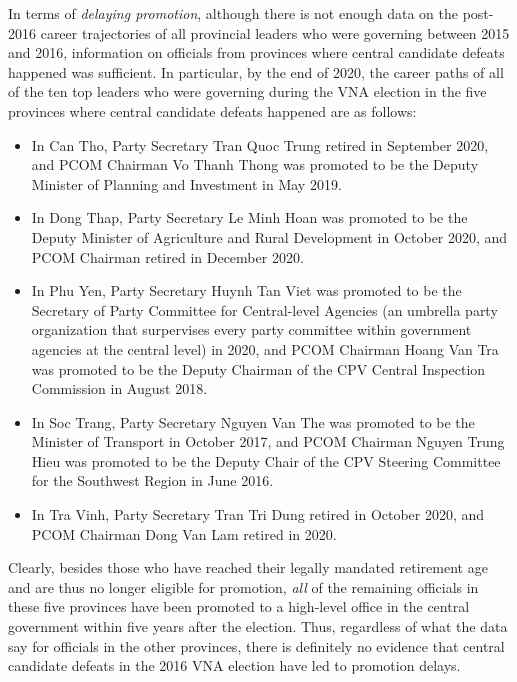 \documentclass[12pt]{article}
\newcommand{\1}{\mathbbm{1}}
\begin{document}
In terms of \textit{delaying promotion}, although there is not enough data on the post-2016 career trajectories of all provincial leaders who were governing between 2015 and 2016, information on officials from provinces where central candidate defeats happened was sufficient. In particular, by the end of 2020, the career paths of all of the ten top leaders who were governing during the VNA election in the five provinces where central candidate defeats happened are as follows:

\begin{itemize}
	\item In Can Tho, Party Secretary Tran Quoc Trung retired in September 2020, and PCOM Chairman Vo Thanh Thong was promoted to be the Deputy Minister of Planning and Investment in May 2019.
	\item In Dong Thap, Party Secretary Le Minh Hoan was promoted to be the Deputy Minister of Agriculture and Rural Development in October 2020, and PCOM Chairman retired in December 2020.
	\item In Phu Yen, Party Secretary Huynh Tan Viet was promoted to be the Secretary of Party Committee for Central-level Agencies (an umbrella party organization that surpervises every party committee within government agencies at the central level) in 2020, and PCOM Chairman Hoang Van Tra was promoted to be the Deputy Chairman of the CPV Central Inspection Commission in August 2018.
	\item In Soc Trang, Party Secretary Nguyen Van The was promoted to be the Minister of Transport in October 2017, and PCOM Chairman Nguyen Trung Hieu was promoted to be the Deputy Chair of the CPV Steering Committee for the Southwest Region in June 2016.
	\item In Tra Vinh, Party Secretary Tran Tri Dung retired in October 2020, and PCOM Chairman Dong Van Lam retired in 2020.
\end{itemize}

Clearly, besides those who have reached their legally mandated retirement age and are thus no longer eligible for promotion, \textit{all} of the remaining officials in these five provinces have been promoted to a high-level office in the central government within five years after the election. Thus, regardless of what the data say for officials in the other provinces, there is definitely no evidence that central candidate defeats in the 2016 VNA election have led to promotion delays.

\clearpage
\end{document}
